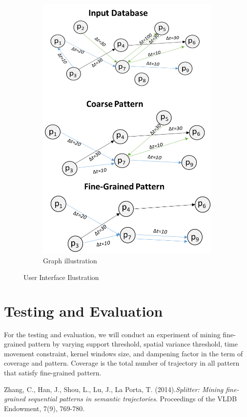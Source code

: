 \documentclass[a4paper,oneside]{article}
\begin{document}
\begin{figure}[!h]
\begin{subfigure}[b]{0.4\linewidth}
				\includegraphics[width=0.7\linewidth]{GraphRepresentation}
				\caption{Graph illustration}
				\label{fig:graph}
			\end{subfigure}
			\caption{User Interface Ilustration}
			\label{fig:UI}
		\end{figure}
		
		
	\section{Testing and Evaluation}
	For the testing and evaluation, we will conduct an experiment of mining fine-grained pattern by varying support threshold, spatial variance threshold, time movement constraint, kernel windows size, and dampening factor in the term of coverage and pattern. Coverage is the total number of trajectory in all pattern that satisfy fine-grained pattern. 
\begin{thebibliography}{1}
	 Zhang, C., Han, J., Shou, L., Lu, J., La Porta, T. (2014).{\em Splitter: Mining fine-grained sequential patterns in semantic trajectories}. Proceedings of the VLDB Endowment, 7(9), 769-780.
\end{thebibliography}
\end{document}
